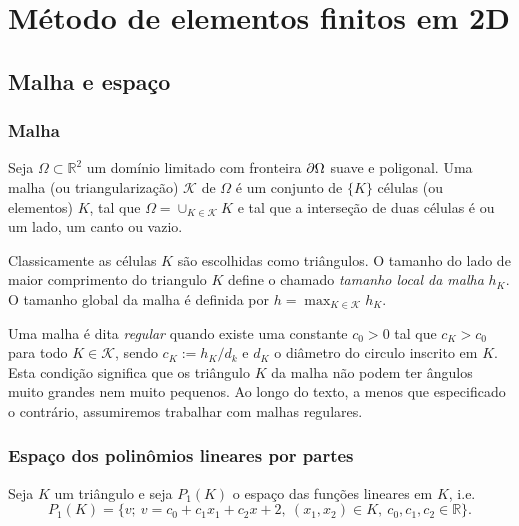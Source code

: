 
\chapter{Método de elementos finitos em 2D}\label{cap_mef2d}
\thispagestyle{fancy}

\section{Malha e espaço}\label{cap_mef2d_sec_malha}

\subsection{Malha}

Seja $\Omega\subset \mathbb{R}^2$ um domínio limitado com fronteira $\partial\Omega$ suave e poligonal. Uma malha (ou triangularização) $\mathcal{K}$ de $\Omega$ é um conjunto de $\{K\}$ células (ou elementos) $K$, tal que $\Omega = \cup_{K\in\mathcal{K}}K$ e tal que a interseção de duas células é ou um lado, um canto ou vazio.

Classicamente as células $K$ são escolhidas como triângulos. O tamanho do lado de maior comprimento do triangulo $K$ define o chamado \emph{tamanho local da malha} $h_K$. O tamanho global da malha é definida por $h = \max_{K\in\mathcal{K}} h_K$.

Uma malha é dita \emph{regular} quando existe uma constante $c_0 > 0$ tal que $c_K > c_0$ para todo $K\in\mathcal{K}$, sendo $c_K := h_K/d_k$ e $d_K$ o diâmetro do circulo inscrito em $K$. Esta condição significa que os triângulo $K$ da malha não podem ter ângulos muito grandes nem muito pequenos. Ao longo do texto, a menos que especificado o contrário, assumiremos trabalhar com malhas regulares.

\subsection{Espaço dos polinômios lineares por partes}

Seja $K$ um triângulo e seja $P_1(K)$ o espaço das funções lineares em $K$, i.e.
\begin{equation}
  P_1(K) = \{v;~v=c_0+c_1x_1+c_2x+2,~(x_1,x_2)\in K,~c_0,c_1,c_2\in\mathbb{R}\}.
\end{equation}

